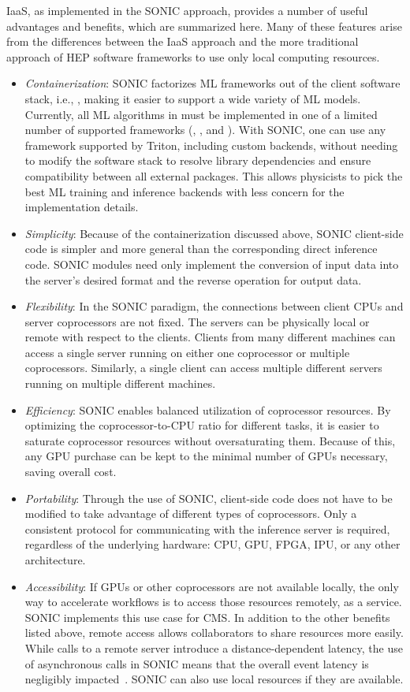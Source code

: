 IaaS, as implemented in the SONIC approach, provides a number of useful advantages and benefits, which are summarized here.
Many of these features arise from the differences between the IaaS approach and the more traditional approach of HEP software frameworks to use only local computing resources.
\begin{itemize}
    \item \emph{Containerization}: SONIC factorizes ML frameworks out of the client software stack, i.e., \CMSSW, making it easier to support a wide variety of ML models. Currently, all ML algorithms in \CMSSW must be implemented in one of a limited number of supported frameworks (\TENSORFLOW, \ONNX, and \XGBOOST). With SONIC, one can use any framework supported by Triton, including custom backends, without needing to modify the \CMSSW software stack to resolve library dependencies and ensure compatibility between all external packages. This allows physicists to pick the best ML training and inference backends with less concern for the implementation details.
    \item \emph{Simplicity}: Because of the containerization discussed above, SONIC client-side code is simpler and more general than the corresponding direct inference code. SONIC modules need only implement the conversion of input data into the server's desired format and the reverse operation for output data.
    \item \emph{Flexibility}: In the SONIC paradigm, the connections between client CPUs and server coprocessors are not fixed. The servers can be physically local or remote with respect to the clients. Clients from many different machines can access a single server running on either one coprocessor or multiple coprocessors. Similarly, a single client can access multiple different servers running on multiple different machines. 
    \item \emph{Efficiency}: SONIC enables balanced utilization of coprocessor resources. By optimizing the coprocessor-to-CPU ratio for different tasks, it is easier to saturate coprocessor resources without oversaturating them. Because of this, any GPU purchase can be kept to the minimal number of GPUs necessary, saving overall cost.
    \item \emph{Portability}: Through the use of SONIC, client-side code does not have to be modified to take advantage of different types of coprocessors. Only a consistent protocol for communicating with the inference server is required, regardless of the underlying hardware: CPU, GPU, FPGA, IPU, or any other architecture.
    \item \emph{Accessibility}: If GPUs or other coprocessors are not available locally, the only way to accelerate workflows is to access those resources remotely, as a service. SONIC implements this use case for CMS. In addition to the other benefits listed above, remote access allows collaborators to share resources more easily. While calls to a remote server introduce a distance-dependent latency, the use of asynchronous calls in SONIC means that the overall event latency is negligibly impacted~\cite{Krupa:2020bwg}. SONIC can also use local resources if they are available.
\end{itemize}

